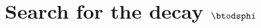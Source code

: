 \chapter{Search for the decay
  \texorpdfstring{$\boldsymbol{\btodsphi}$}{\btodsphi}}
\label{ch:dsphi}













\clearpage
